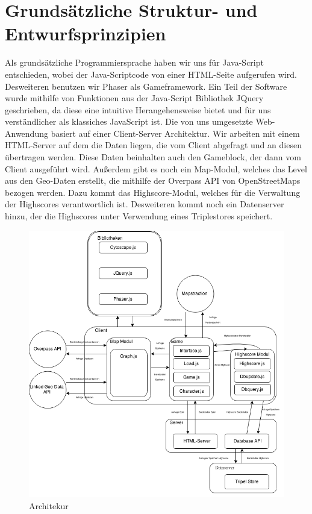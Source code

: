 \documentclass[11pt,a4paper]{article}
\begin{document}
\section{Grundsätzliche Struktur- und Entwurfsprinzipien}
Als grundsätzliche Programmiersprache haben wir uns für Java-Script entschieden, wobei der Java-Scriptcode von einer HTML-Seite aufgerufen wird. Desweiteren benutzen wir Phaser als Gameframework.
Ein Teil der Software wurde mithilfe von Funktionen aus der Java-Script Bibliothek JQuery geschrieben, da diese eine intuitive Herangehensweise bietet und für uns verständlicher als klassiches JavaScript ist.
Die von uns umgesetzte Web-Anwendung basiert auf einer Client-Server Architektur. Wir arbeiten mit einem HTML-Server auf dem die Daten liegen, die vom Client abgefragt und an diesen übertragen werden. Diese Daten beinhalten auch den Gameblock, der dann vom Client ausgeführt wird. Außerdem gibt es noch ein Map-Modul, welches das Level aus den Geo-Daten erstellt, die mithilfe der Overpass API von OpenStreetMaps bezogen werden. Dazu kommt das Highscore-Modul, welches für die Verwaltung der Highscores verantwortlich ist.
Desweiteren kommt noch ein Datenserver hinzu, der die Highscores unter Verwendung eines Triplestores speichert.\\
\begin{figure}[htb]
  \centering
  \includegraphics[scale=0.6]{dia_2.png}
\caption{Architekur}
  \label{arch}
\end{figure} 
\end{document}
